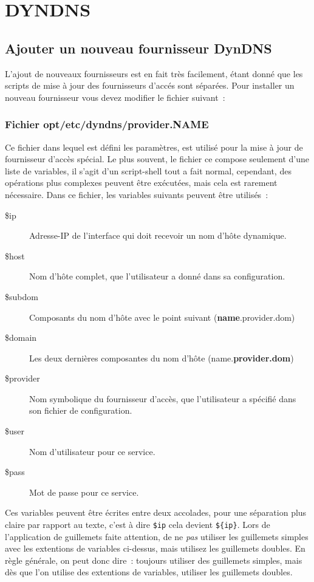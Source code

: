 
\section{DYNDNS}
\subsection{Ajouter un nouveau fournisseur DynDNS}

L'ajout de nouveaux fournisseurs est en fait très facilement, étant donné
que les scripts de mise à jour des fournisseurs d'accés sont séparées. Pour
installer un nouveau fournisseur vous devez modifier le fichier suivant~:

\subsubsection{Fichier opt/etc/dyndns/provider.NAME}

Ce fichier dans lequel est défini les paramètres, est utilisé pour la  mise à
jour de fournisseur d'accès spécial. Le plus souvent, le fichier ce compose
seulement d'une liste de variables, il s'agit d'un script-shell tout a fait
normal, cependant, des opérations plus complexes peuvent être exécutées,
mais cela est rarement nécessaire. Dans ce fichier, les variables suivants
peuvent être utilisés~:

\begin{description}
\item[\$ip] Adresse-IP de l'interface qui doit recevoir un nom d'hôte
  dynamique.
\item[\$host] Nom d'hôte complet, que l'utilisateur a donné dans sa
  configuration.
\item[\$subdom] Composants du nom d'hôte avec le point suivant
  (\textbf{name}.provider.dom)
\item[\$domain] Les deux dernières composantes du nom d'hôte
  (name.\textbf{provider.dom})
\item[\$provider] Nom symbolique du fournisseur d'accès, que l'utilisateur a
  spécifié dans son fichier de configuration.
\item[\$user] Nom d'utilisateur pour ce service.
\item[\$pass] Mot de passe pour ce service.
\end{description}

Ces variables peuvent être écrites entre deux accolades, pour une séparation plus
claire par rapport au texte, c'est à dire \texttt{\$ip} cela devient \texttt{\$\{ip\}}.
Lors de l'application de guillemets faite attention, de ne \emph{pas} utiliser
les guillemets simples avec les extentions de variables ci-dessus, mais utilisez
les guillemets doubles. En règle générale, on peut donc dire~: toujours utiliser
des guillemets simples, mais dès que l'on utilise des extentions de variables,
utiliser les guillemets doubles.


